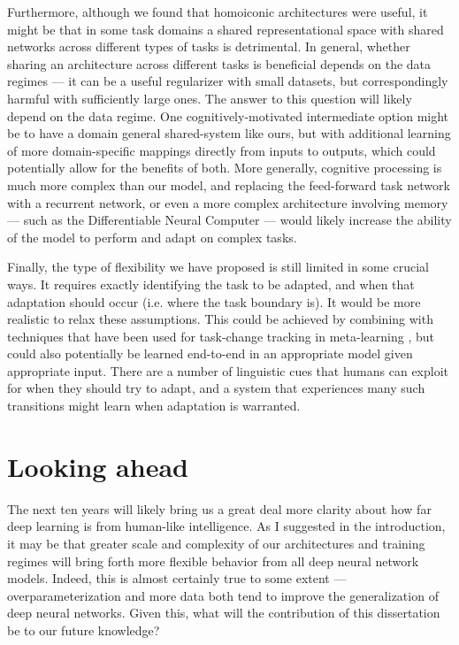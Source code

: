 Furthermore, although we found that homoiconic architectures were useful, it might be that in some task domains a shared representational space with shared networks across different types of tasks is detrimental. In general, whether sharing an architecture across different tasks is beneficial depends on the data regimes --- it can be a useful regularizer with small datasets, but correspondingly harmful with sufficiently large ones. The answer to this question will likely depend on the data regime. One cognitively-motivated intermediate option might be to have a domain general shared-system like ours, but with additional learning of more domain-specific mappings directly from inputs to outputs, which could potentially allow for the benefits of both. More generally, cognitive processing is much more complex than our model, and replacing the feed-forward task network with a recurrent network, or even a more complex architecture involving memory --- such as the Differentiable Neural Computer \citep{Graves2016} --- would likely increase the ability of the model to perform and adapt on complex tasks.\par 

Finally, the type of flexibility we have proposed is still limited in some crucial ways. It requires exactly identifying the task to be adapted, and when that adaptation should occur (i.e. where the task boundary is). It would be more realistic to relax these assumptions. This could be achieved by combining with techniques that have been used for task-change tracking in meta-learning \citep[e.g.][]{Nagabandi2019}, but could also potentially be learned end-to-end in an appropriate model given appropriate input. There are a number of linguistic cues that humans can exploit for when they should try to adapt, and a system that experiences many such transitions might learn when adaptation is warranted. \par 


\section{Looking ahead}

The next ten years will likely bring us a great deal more clarity about how far deep learning is from human-like intelligence. As I suggested in the introduction, it may be that greater scale and complexity of our architectures and training regimes will bring forth more flexible behavior from all deep neural network models. Indeed, this is almost certainly true to some extent --- overparameterization and more data both tend to improve the generalization of deep neural networks. Given this, what will the contribution of this dissertation be to our future knowledge? \par 

